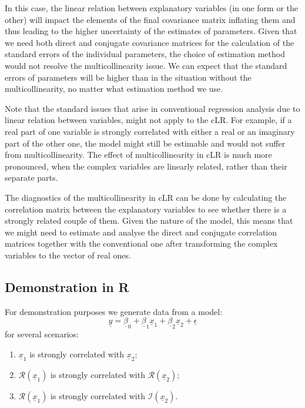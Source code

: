 \documentclass[
]{book}
\providecommand{\tightlist}{%
  \setlength{\itemsep}{0pt}\setlength{\parskip}{0pt}}
\begin{document}
In this case, the linear relation between explanatory variables (in one form or the other) will impact the elements of the final covariance matrix inflating them and thus leading to the higher uncertainty of the estimates of parameters. Given that we need both direct and conjugate covariance matrices for the calculation of the standard errors of the individual parameters, the choice of estimation method would not resolve the multicollinearity issue. We can expect that the standard errors of parameters will be higher than in the situation without the multicollinearity, no matter what estimation method we use.

Note that the standard issues that arise in conventional regression analysis due to linear relation between variables, might not apply to the cLR. For example, if a real part of one variable is strongly correlated with either a real or an imaginary part of the other one, the model might still be estimable and would not suffer from multicollinearity. The effect of multicollinearity in cLR is much more pronounced, when the complex variables are linearly related, rather than their separate parts.

The diagnostics of the multicollinearity in cLR can be done by calculating the correlation matrix between the explanatory variables to see whether there is a strongly related couple of them. Given the nature of the model, this means that we might need to estimate and analyse the direct and conjugate correlation matrices together with the conventional one after transforming the complex variables to the vector of real ones.

\hypertarget{demonstration-in-r-3}{%
\subsection{Demonstration in R}\label{demonstration-in-r-3}}

For demonstration purposes we generate data from a model:
\begin{equation*}
    \underline{y} = \underline{\beta}_0 + \underline{\beta}_1 \underline{x}_{1} + \underline{\beta}_2 \underline{x}_{2} + \underline{\epsilon}
\end{equation*}
for several scenarios:

\begin{enumerate}
\def\labelenumi{\arabic{enumi}.}
\tightlist
\item
  \(\underline{x}_{1}\) is strongly correlated with \(\underline{x}_{2}\);
\item
  \(\mathcal{R}\left(\underline{x}_{1}\right)\) is strongly correlated with \(\mathcal{R}\left(\underline{x}_{2}\right)\);
\item
  \(\mathcal{R}\left(\underline{x}_{1}\right)\) is strongly correlated with \(\mathcal{I}\left(\underline{x}_{2}\right)\).
\end{enumerate}
\end{document}
